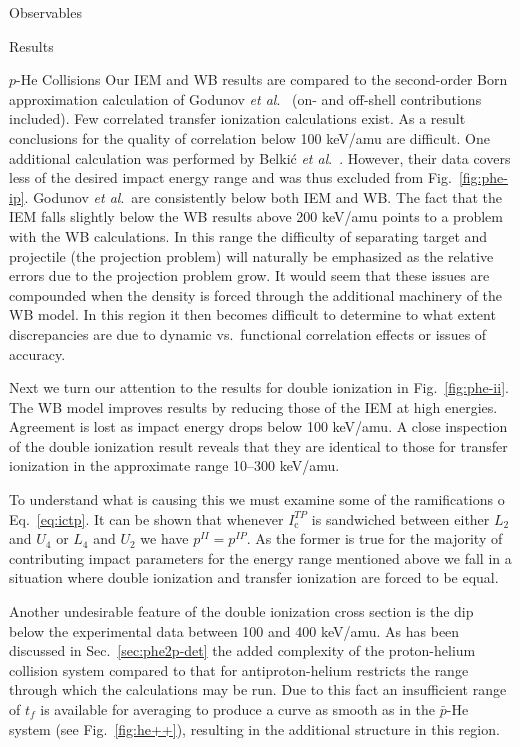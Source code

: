 \documentclass[letterpaper, 11 pt]{report}
\begin{document}
\begin{chapter}{Observables \label{chap:p-he2p-he}}
\begin{section}{Results \label{sec:phe2p-res}}
\begin{subsection}{\texorpdfstring{$p$}{p}-He Collisions \label{sec:phe-res}}
         Our IEM and WB results are compared to the second-order Born approximation calculation of
         Godunov \textit{et al}.~\cite{Godunov-06} (on- and off-shell contributions included). Few
         correlated transfer ionization calculations exist. As a result conclusions for the quality of
         correlation below 100 keV/amu are difficult. One additional calculation was performed by
         Belki\'{c} \textit{et al}.~\cite{BM-11}. However, their data covers less of the desired impact
         energy range and was thus excluded from Fig.~\ref{fig:phe-ip}. Godunov \textit{et al}.\ are
         consistently below both IEM and WB. The fact that the IEM falls slightly below the WB results
         above 200 keV/amu points to a problem with the WB calculations. In this range the difficulty of
         separating target and projectile (the projection problem) will naturally be emphasized as the
         relative errors due to the projection problem grow. It would seem that these issues are
         compounded when the density is forced through the additional machinery of the WB model. In this
         region it then becomes difficult to determine to what extent discrepancies are due to dynamic
         vs.\ functional correlation effects or issues of accuracy.

         Next we turn our attention to the results for double ionization in Fig.~\ref{fig:phe-ii}. The
         WB model improves results by reducing those of the IEM at high energies. Agreement is lost as
         impact energy drops below 100 keV/amu. A close inspection of the double ionization result
         reveals that they are identical to those for transfer ionization in the approximate range
         10--300 keV/amu.
         
         To understand what is causing this we must examine some of the ramifications o
         Eq.~\eqref{eq:ictp}. It can be shown that whenever $I^{TP}_\mathrm{c}$ is sandwiched between
         either $L_2$ and $U_4$ or $L_4$ and $U_2$ we have $p^{II} = p^{IP}$. As the former is true for
         the majority of contributing impact parameters for the energy range mentioned above we fall in
         a situation where double ionization and transfer ionization are forced to be equal.

         Another undesirable feature of the double ionization cross section is the dip below the
         experimental data between 100 and 400 keV/amu. As has been discussed in
         Sec.~\ref{sec:phe2p-det} the added complexity of the proton-helium collision system compared to
         that for antiproton-helium restricts the range through which the calculations may be run. Due
         to this fact an insufficient range of $t_f$ is available for averaging to produce a curve as
         smooth as in the $\bar{p}$-He system (see Fig.~\ref{fig:he++}), resulting in the additional
         structure in this region.
        

\end{subsection}
\end{section}
\end{chapter}
\end{document}
